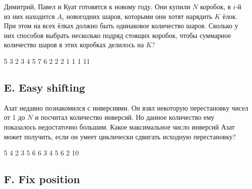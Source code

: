 Димитрий, Павел и Куат готовятся к новому году. Они купили $N$ коробок, в $i$-й из них находится $A_i$ новогодних шаров, которыми они хотят нарядить $K$ ёлок. При этом на всех ёлках должно быть одинаковое количество шаров. Сколько у них способов выбрать несколько подряд стоящих коробок, чтобы суммарное количество шаров в этих коробках делилось на $K$?



\examplee
{5 3  2 3 4 5}
{7}
{6 2  2 2 1 1 1}
{11}




\subsection*{E. Easy shifting}


Азат недавно познакомился с инверсиями. Он взял некоторую перестановку чисел от 1 до $N$ и посчитал количество инверсий. Но данное количество ему показалось недостаточно большим. Какое максимальное число инверсий Азат может получить, если он умеет циклически сдвигать исходную перестановку?



\examplee
{5  4 2 3 5}
{6}
{6  3 4 5 6 2}
{10}




\subsection*{F. Fix position}


